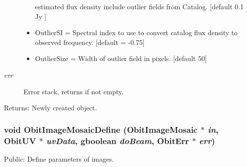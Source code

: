 \begin{Desc}
\begin{description}
\begin{itemize}
estimated flux density include outlier fields from Catalog. [default 0.1 Jy ] \item Outlier\-SI = Spectral index to use to convert catalog flux density to observed frequency. [default = -0.75] \item Outlier\-Size = Width of outlier field in pixels. [default 50] \end{itemize}
\item[{\em err}]Error stack, returns if not empty. \end{description}
\end{Desc}
\begin{Desc}
\item[Returns:]Newly created object. \end{Desc}
\subsubsection{\setlength{\rightskip}{0pt plus 5cm}void Obit\-Image\-Mosaic\-Define ({\bf Obit\-Image\-Mosaic} $\ast$ {\em in}, {\bf Obit\-UV} $\ast$ {\em uv\-Data}, gboolean {\em do\-Beam}, {\bf Obit\-Err} $\ast$ {\em err})}\label{ObitImageMosaic_8c_a23}


Public: Define parameters of images. 


